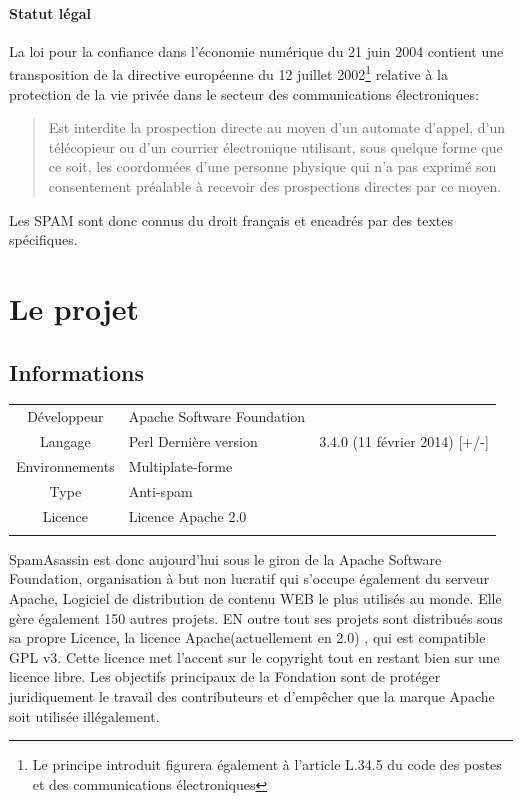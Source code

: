 \documentclass[a4paper,11pt]{article}
\begin{document}
\paragraph{Statut légal}


La loi pour la confiance dans l'économie numérique du 21 juin 2004 contient une transposition de la
directive européenne du 12 juillet 2002\footnote{Le principe introduit figurera également à l'article L.34.5 du code 
des postes et des communications électroniques } relative à la protection de la vie privée dans le secteur des communications
électroniques:
\begin{quote}
 Est interdite la prospection directe au moyen d'un automate d'appel, d'un télécopieur ou d'un courrier électronique utilisant,
 sous quelque forme que ce soit, les coordonnées d'une personne physique qui n'a pas exprimé son consentement préalable à recevoir
 des prospections directes par ce moyen. 
\end{quote}
Les SPAM sont donc connus du droit français et encadrés par des textes spécifiques.

\section{Le projet}

\subsection{Informations}


\begin{center}
\begin{tabular}{cll}
\hline
Développeur & Apache Software Foundation  \\
Langage & Perl 
Dernière version & 3.4.0 (11 février 2014) [+/-] \\
Environnements & Multiplate-forme  \\
Type & Anti-spam & \\
Licence & Licence Apache 2.0 \\ \\
\hline
\end{tabular}
\end{center}



SpamAsassin est donc aujourd'hui sous le giron de la Apache Software Foundation, organisation à but non lucratif qui
s'occupe également du serveur Apache, Logiciel de distribution de contenu WEB le plus utilisés au monde. 
Elle gère également 150 autres projets.
EN outre tout ses projets sont distribués sous sa propre Licence, la licence Apache(actuellement en 2.0) , qui est compatible GPL v3.
Cette licence met l’accent sur le copyright tout en restant bien sur une licence libre. Les objectifs principaux de la Fondation sont de protéger 
juridiquement le travail des contributeurs et d'empêcher que la marque Apache soit utilisée illégalement.
\end{document}
